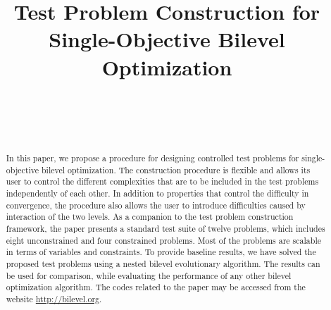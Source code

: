 \documentclass[twoside]{article}
\begin{document}
\newcommand{\boldx}{\mbox{$\mathbf{x}$}}
\newcommand{\boldy}{\mbox{$\mathbf{y}$}}
\newcommand{\boldf}{\mbox{$\mathbf{f}$}}
\newcommand{\boldz}{\mbox{$\mathbf{z}$}}
\newcommand{\boldF}{\mbox{$\mathbf{F}$}}
\newcommand{\boldG}{\mbox{$\mathbf{G}$}}
\newcommand{\boldg}{\mbox{$\mathbf{g}$}}
\newcommand{\boldh}{\mbox{$\mathbf{h}$}}
\newcommand{\boldH}{\mbox{$\mathbf{H}$}}
\newcommand{\boldzero}{\mbox{$\mathbf{0}$}}
\newcommand{\Rbb}{\mbox{$\mathbb R$}}

\newtheorem{defn}{Definition}

\title{\bf Test Problem Construction for Single-Objective Bilevel Optimization}  

\author{ \hfill {}\\ 
\AND
        \hfill {}\\
\AND
        \hfill {}\\
}

\maketitle



\begin{abstract}
In this paper, we propose a procedure for designing controlled test problems for single-objective bilevel optimization. The construction procedure is flexible and allows its user to control the different complexities that are to be included in the test problems independently of each other. In addition to properties that control the difficulty in convergence, the procedure also allows the user to introduce difficulties caused by interaction of the two levels. As a companion to the test problem construction framework, the paper presents a standard test suite of twelve problems, which includes eight unconstrained and four constrained problems. Most of the problems are scalable in terms of variables and constraints. To provide baseline results, we have solved the proposed test problems using a nested bilevel evolutionary algorithm. The results can be used for comparison, while evaluating the performance of any other bilevel optimization algorithm. The codes related to the paper may be accessed from the website \url{http://bilevel.org}.
\end{abstract}
\end{document}
